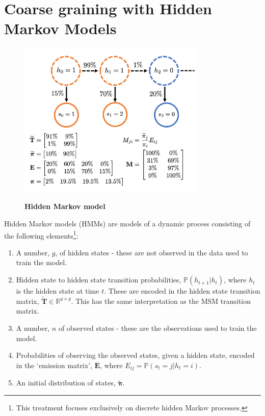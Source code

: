 \section{Coarse graining with Hidden Markov Models}\label{sec:theory_hmm}
\begin{figure}
    \centering
    \caption{\textbf{Hidden Markov model}}
    \includegraphics[width=0.8\textwidth]{chapters/theory/figures/hmm.png}
    \label{fig:theory_hmm}
\end{figure}
Hidden Markov models (HMMs) are models of a dynamic process consisting of the following elements\footnote{This treatment focuses exclusively on discrete hidden Markov processes.}\cite{rabinerTutorialHiddenMarkov1989}: 
\begin{enumerate}
    \item A number, $g$, of hidden states - these are not observed in the data used to train the model.  
    \item Hidden state to hidden state transition probabilities, $\mathbb{P}(h_{t+1}|h_{t})$, where $h_{t}$ is the hidden state at time $t$. These are encoded in the hidden state transition matrix, $\widetilde{\mathbf{T}}\in \mathbb{R}^{g \times g}$. This has the same interpretation as the MSM transition matrix.  
    \item A number, $n$ of observed states - these are the observations used to train the model. 
    \item Probabilities of observing the observed states, given a hidden state, encoded in the `emission matrix', $\mathbf{E}$, where  $E_{ij} = \mathbb{P}(s_t=j|h_t=i)$. 
    \item An initial distribution of states, $\widetilde{\bm{\pi}}$.
\end{enumerate}


